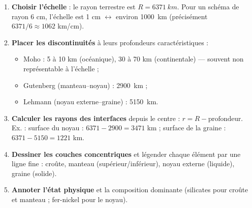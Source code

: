 \documentclass[11pt]{article}
\begin{document}
\begin{methode}
\begin{enumerate}
\item \textbf{Choisir l'échelle} : le rayon terrestre est $R = \SI{6371}{km}$. Pour un schéma de rayon 6 cm, l'échelle est 1 cm $\leftrightarrow$ environ \SI{1000}{km} (précisément $6371/6 \approx 1062$ km/cm).
\item \textbf{Placer les discontinuités} à leurs profondeurs caractéristiques :
\begin{itemize}
\item Moho : 5 à 10 km (océanique), 30 à 70 km (continentale) — souvent non représentable à l'échelle ;
\item Gutenberg (manteau--noyau) : \SI{2900}{km} ;
\item Lehmann (noyau externe--graine) : \SI{5150}{km}.
\end{itemize}
\item \textbf{Calculer les rayons des interfaces} depuis le centre : $r = R - \text{profondeur}$. Ex. : surface du noyau : $6371 - 2900 = 3471$ km ; surface de la graine : $6371 - 5150 = 1221$ km.
\item \textbf{Dessiner les couches concentriques} et légender chaque élément par une ligne fine : croûte, manteau (supérieur/inférieur), noyau externe (liquide), graine (solide).
\item \textbf{Annoter l'état physique} et la composition dominante (silicates pour croûte et manteau ; fer-nickel pour le noyau).
\end{enumerate}
\end{methode}
\end{document}
